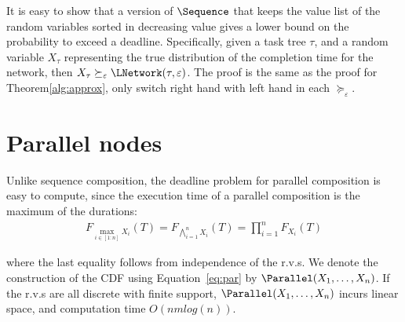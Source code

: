 \documentclass{article}
\DeclareMathOperator{\support}{support}
\begin{document}
It is easy to show that a version of $\Sequence$ that keeps the value list of the
random variables sorted in decreasing value 
gives a lower bound on the probability to exceed a deadline. 
Specifically, given a task tree $\tau$, and a random variable $X_\tau$ representing the true 
distribution of the completion time for the network, 
then $X_\tau \succeq_\varepsilon \LNetwork(\tau,\varepsilon)$. The proof is the same as the proof for 
Theorem\ref{alg:approx}, only switch right hand with left hand in each $\succeq_{\varepsilon}$.


\section{Parallel nodes}\label{sec:par}


Unlike sequence composition, the deadline problem for parallel composition
is easy to compute, since the execution time of
a parallel composition is the maximum of the durations:
{\small
\begin{align}
F_{\max_{i\in[1:n]}X_i}(T)
{=}F_{\bigwedge_{i=1}^n X_i}(T) 
{=}\prod_{i=1}^n F_{X_i} (T)
\label{eq:par}
\end{align}}

\noindent where the last equality follows from independence of the r.v.s.
We denote the construction of the CDF using Equation~\eqref{eq:par} by $\Parallel(X_1,\dots , X_n)$.
If the r.v.s are all discrete with finite support, $\Parallel(X_1,\dots , X_n)$
incurs linear space, and computation time $O(nm log(n))$.

%
%
%  
%  
% 
\end{document}
